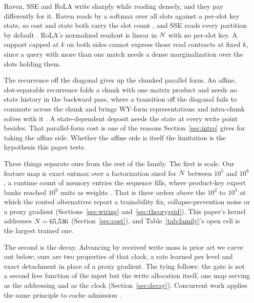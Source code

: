 Raven, SSE and RoLA write sharply while reading densely, and they pay differently for it. Raven reads by a softmax over all slots against a per-slot key state, so cost and state both carry the slot count \citep{afzal2026raven}, and SSE reads every partition by default \citep{sse2025}. RoLA's normalized readout is linear in $N$ with no per-slot key. A support capped at $k$ on both sides cannot express those read contracts at fixed $k$, since a query with more than one match needs a dense marginalization over the slots holding them.

The recurrence off the diagonal gives up the chunked parallel form. An affine, slot-separable recurrence folds a chunk with one matrix product and needs no state history in the backward pass, where a transition off the diagonal fails to commute across the chunk and brings WY-form representations and intra-chunk solves with it \citep{yang2024deltanet, yang2024gdn}. A state-dependent deposit needs the state at every write point besides. That parallel-form cost is one of the reasons Section~\ref{sec:intro} gives for taking the affine side. Whether the affine side is itself the limitation is the hypothesis this paper tests.

Three things separate ours from the rest of the family. The first is scale. Our feature map is exact entmax over a factorization sized for $N$ between $10^5$ and $10^6$, a runtime count of memory entries the sequence fills, where product-key expert banks reached $10^6$ units as weights \citep{lample2019pkm, he2024peer}. That is three orders above the $10^2$ to $10^3$ at which the routed alternatives report a trainability fix, collapse-prevention noise or a proxy gradient (Sections~\ref{sec:wiring} and~\ref{sec:theorygrid}). This paper's kernel addresses $N = 65{,}536$ (Section~\ref{sec:cost}), and Table~\ref{tab:family}'s open cell is the largest trained one.

The second is the decay. Advancing by received write mass is prior art we carve out below; ours are two properties of that clock, a rate learned per level and exact detachment in place of a proxy gradient. The tying follows: the gate is not a second free function of the input but the write allocation itself, one map serving as the addressing and as the clock (Section~\ref{sec:decay}). Concurrent work applies the same principle to cache admission \citep{cui2026hola}.


